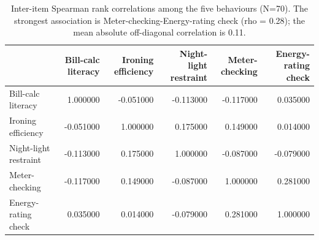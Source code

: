 \begin{table}
\caption{Inter-item Spearman rank correlations among the five behaviours (N=70). The strongest association is Meter-checking-Energy-rating check (rho = 0.28); the mean absolute off-diagonal correlation is 0.11.}
\label{tab:05_interitem_spearman}
\begin{tabular}{lrrrrr}
\toprule
 & Bill-calc literacy & Ironing efficiency & Night-light restraint & Meter-checking & Energy-rating check \\
\midrule
Bill-calc literacy & 1.000000 & -0.051000 & -0.113000 & -0.117000 & 0.035000 \\
Ironing efficiency & -0.051000 & 1.000000 & 0.175000 & 0.149000 & 0.014000 \\
Night-light restraint & -0.113000 & 0.175000 & 1.000000 & -0.087000 & -0.079000 \\
Meter-checking & -0.117000 & 0.149000 & -0.087000 & 1.000000 & 0.281000 \\
Energy-rating check & 0.035000 & 0.014000 & -0.079000 & 0.281000 & 1.000000 \\
\bottomrule
\end{tabular}
\end{table}
